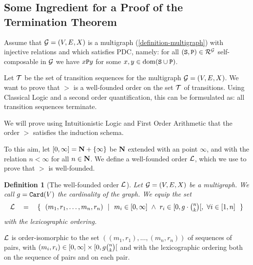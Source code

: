 \documentclass{lmcs}
\newtheorem{definition}[theorem]{Definition}
\begin{document}


\subsection{Some Ingredient for a Proof of the Termination Theorem}
\label{subsection-proof-termination}
Assume that ${\mathcal G}=(V,E,X)$ is a multigraph (\ref{definition-multigraph})
with injective relations and which
satisfies PDC, namely: for all $({\tt S},{\tt P}) \in {\mathcal R}^{\mathcal G}$ self-composable
in ${\mathcal G}$ we have $x {\tt P} y$ for some $x, y \in {\rm dom}({\tt S} \cup {\tt P})$.

Let ${\mathcal T}$ be the set of transition sequences for the multigraph ${\mathcal G}=(V,E,X)$. 
We want to prove that $>$ is a well-founded order on the set ${\mathcal T}$ of transitions. 
Using Classical Logic and a second order quantification,
this can be formsulated as: all transition sequences terminate.

We will prove using Intuitionistic Logic  and First Order Arithmetic
that the order $>$ satisfies the induction schema. 

To this aim, let $[0,\infty] = {\bf N} + \{\infty\}$ be ${\bf N}$ extended with an
 point $\infty$, and with the relation $n < \infty$
for all $n \in {\bf N}$. We define a well-founded order ${\mathcal L}$, which we use to prove
that $>$ is well-founded.

\begin{definition}[The well-founded order ${\mathcal L}$]
\label{definition-well-founded-order-L}
Let ${\mathcal G}=(V,E,X)$ be a multigraph. We call $g = {\tt Card}(V)$ the cardinality of the graph. 
We equip the set 
$$
\setL 
\ \ \ = \ \ \ 
\{ \ \ 
(m_1,r_1, \ldots, m_n,r_n)
  \ \  | \ \ 
    m_i \in [0,\infty] \ \wedge \ r_i \in [0, g \cdot \newton{n}{k}[, \ \forall i \in [1,n]
\ \ \}
$$
with the lexicographic ordering. 
\end{definition}

${\mathcal L}$ is order-isomorphic to the set $((m_1,r_1), \ldots, 
(m_n,r_n))$ of sequences of pairs, with
$(m_i,r_i) \in [0,\infty] \times [0,g \newton{n}{k}[$ and with
the lexicographic ordering both on the sequence of pairs and on each pair.

%
\end{document}
